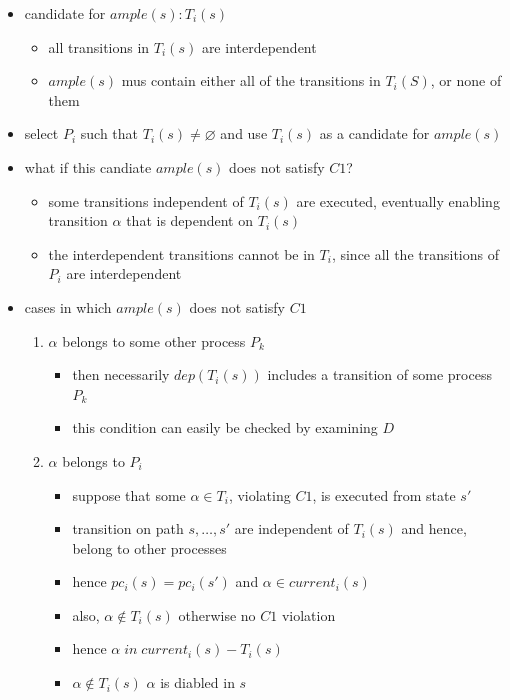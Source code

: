 \documentclass[a4paper, 10pt]{article}
\begin{document}
\begin{itemize}
     \item candidate for $ample(s): T_i(s)$
    \begin{itemize}
        \item all transitions in $T_i(s)$ are interdependent
        \item $ample(s)$ mus contain either all of the transitions in $T_i(S)$, or none of them
    \end{itemize}
    \item select $P_i$ such that $T_i(s)\not=\varnothing$ and use $T_i(s)$ as a candidate for $ample(s)$
    \item what if this candiate $ample(s)$ does not satisfy $C1$?
    \begin{itemize}
        \item some transitions independent of $T_i(s)$ are executed, eventually enabling transition $\alpha$ that is dependent on $T_i(s)$
        \item the interdependent transitions cannot be in $T_i$, since all the transitions of $P_i$ are interdependent
    \end{itemize}
    \item cases in which $ample(s)$ does not satisfy $C1$
    \begin{enumerate}
        \item $\alpha$ belongs to some other process $P_k$
        \begin{itemize}
            \item then necessarily $dep(T_i(s))$ includes a transition of some process $P_k$
            \item this condition can easily be checked by examining $D$
        \end{itemize}
        \item $\alpha$ belongs to $P_i$
        \begin{itemize}
            \item suppose that some $\alpha\in T_i$, violating $C1$, is executed from state $s'$
            \item transition on path $s,\dots,s'$ are independent of $T_i(s)$ and hence, belong to other processes
            \item hence $pc_i(s)=pc_i(s')$ and $\alpha\in current_i(s)$
            \item also, $\alpha\not\in T_i(s)$ otherwise no $C1$ violation
            \item hence $\alpha \;in\; current_i(s)-T_i(s)$
            \item $\alpha\not\in T_i(s)$ \follows $\alpha$ is diabled in $s$

\end{itemize}
\end{enumerate}
\end{itemize}
\end{document}
